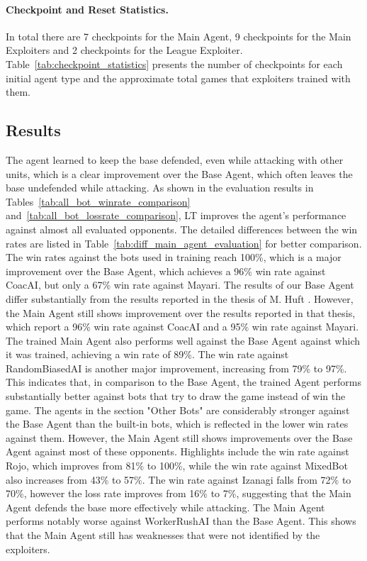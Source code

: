 \documentclass[10pt,twocolumn,letterpaper]{article}
\begin{document}
\paragraph{Checkpoint and Reset Statistics.}
In total there are 7 checkpoints for the Main Agent, 9 checkpoints for the Main Exploiters and 2 checkpoints for the League Exploiter.
Table~\ref{tab:checkpoint_statistics} presents the number of checkpoints for each initial agent type and the approximate total games that exploiters trained with them.


\subsection{Results}
The agent learned to keep the base defended, even while attacking with other units, which is a clear improvement over the Base Agent, which often leaves the base undefended while attacking.
As shown in the evaluation results in Tables~\ref{tab:all_bot_winrate_comparison} and~\ref{tab:all_bot_lossrate_comparison}, LT improves the agent’s performance against almost all evaluated opponents.
The detailed differences between the win rates are listed in Table~\ref{tab:diff_main_agent_evaluation} for better comparison.
The win rates against the bots used in training reach 100\%, which is a major improvement over the Base Agent, which achieves a 96\% win rate against CoacAI, but only a 67\% win rate against Mayari.
The results of our Base Agent differ substantially from the results reported in the thesis of M. Huft \cite{huft2023microrts}.
However, the Main Agent still shows improvement over the results reported in that thesis, which report a 96\% win rate against CoacAI and a 95\% win rate against Mayari.
The trained Main Agent also performs well against the Base Agent against which it was trained, achieving a win rate of 89\%.
The win rate against RandomBiasedAI is another major improvement, increasing from 79\% to 97\%.
This indicates that, in comparison to the Base Agent, the trained Agent performs substantially better against bots that try to draw the game instead of win the game.
The agents in the section "Other Bots" are considerably stronger against the Base Agent than the built-in bots, which is reflected in the lower win rates against them.
However, the Main Agent still shows improvements over the Base Agent against most of these opponents.
Highlights include the win rate against Rojo, which improves from 81\% to 100\%, while the win rate against MixedBot also increases from 43\% to 57\%.
The win rate against Izanagi falls from 72\% to 70\%, however the loss rate improves from 16\% to 7\%, suggesting that the Main Agent defends the base more effectively while attacking.
The Main Agent performs notably worse against WorkerRushAI than the Base Agent.
This shows that the Main Agent still has weaknesses that were not identified by the exploiters.
\end{document}
